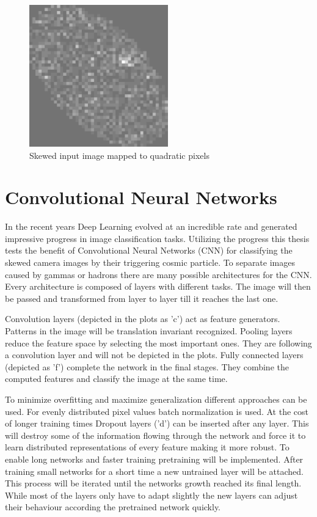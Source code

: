 \begin{figure}
    \centering
    \includegraphics[width=6cm]{Plots/Preprocessed_Image.png}
    \caption{Skewed input image mapped to quadratic pixels}
    \label{fig:preprocessed_image}
\end{figure}



\section{Convolutional Neural Networks}
In the recent years Deep Learning evolved at an incredible rate and generated impressive progress in image classification tasks.
Utilizing the progress this thesis tests the benefit of Convolutional Neural Networks (CNN) for classifying the skewed camera images
by their triggering cosmic particle.
To separate images caused by gammas or hadrons there are many possible architectures for the CNN.
Every architecture is composed of layers with different tasks.
The image will then be passed and transformed from layer to layer till it reaches the last one.

Convolution layers (depicted in the plots as 'c') act as feature generators.
Patterns in the image will be translation invariant recognized.
Pooling layers reduce the feature space by selecting the most important ones.
They are following a convolution layer and will not be depicted in the plots.
Fully connected layers (depicted as 'f') complete the network in the final stages.
They combine the computed features and classify the image at the same time.

To minimize overfitting and maximize generalization different approaches can be used.
For evenly distributed pixel values batch normalization is used.
At the cost of longer training times Dropout layers ('d') can be inserted after any layer.
This will destroy some of the information flowing through the network
and force it to learn distributed representations of every feature making it more robust.
To enable long networks and faster training pretraining will be implemented.
After training small networks for a short time a new untrained layer will be attached.
This process will be iterated until the networks growth reached its final length.
While most of the layers only have to adapt slightly
the new layers can adjust their behaviour according the pretrained network quickly.

